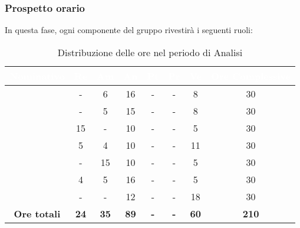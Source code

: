 \subsubsection{Prospetto orario}
In questa fase, ogni componente del gruppo rivestirà i seguenti ruoli:
\begin{table}[H]
	\begin{center}
		\begin{tabular}{ |c c c c c c c c|}
		\rowcolor{darkblue} 
		\textcolor{white}{\textbf{Nominativo}} & \textcolor{white}{\textbf{Re}} & \textcolor{white}{\textbf{Am}} & \textcolor{white}{\textbf{An}} & \textcolor{white}{\textbf{Pt}} & \textcolor{white}{\textbf{Pr}} & \textcolor{white}{\textbf{Ve}} & \textcolor{white}{\textbf{Ore Complessive}} \\ \hline
		\BL 	& - 	& 6 	& 16 	& - 	& - 	& 8 	& 30 \\ \hline
		\FF 	& - 	& 5 	& 15 	& - 	& - 	& 8 	& 30 \\ \hline
		\MM	& 15	& - 	& 10 	& - 	& - 	& 5 	& 30 \\ \hline
		\PC	& 5 	& 4 	& 10 	& - 	& - 	& 11	& 30 \\ \hline
		\TG 	& - 	& 15	& 10 	& - 	& - 	& 5 	& 30 \\ \hline
		\TL 	& 4 	& 5 	& 16 	& - 	& - 	& 5 	& 30 \\ \hline
		\VD 	& - 	& -  	& 12 	& - 	& - 	& 18 	& 30 \\ \hline
		\textbf{Ore totali} & \textbf{24} & \textbf{35} & \textbf{89} & \textbf{-} & \textbf{-} & \textbf{60} & \textbf{210} \\ \hline
		\end{tabular}
	\caption{Distribuzione delle ore nel periodo di Analisi}
	\end{center}
\end{table}
